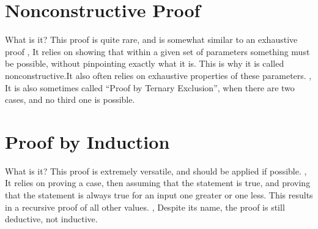 	\section{Nonconstructive Proof}
	\begin{namedframe}{What is it?}
		This proof is quite rare, and is somewhat similar to an exhaustive proof
		\sep
		It relies on showing that within a given set of parameters something must be possible, without pinpointing exactly what it is. This is why it is called nonconstructive.It also often relies on exhaustive properties of these parameters.
		\sep
		It is also sometimes called ``Proof by Ternary Exclusion'', when there are two cases, and no third one is possible.
	\end{namedframe}
	
	\section{Proof by Induction}
	\begin{namedframe}{What is it?}
		This proof is extremely versatile, and should be applied if possible.
		\sep
		It relies on proving a case, then assuming that the statement is true, and proving that the statement is always true for an input one greater or one less. This results in a recursive proof of all other values.
		\sep
		Despite its name, the proof is still deductive, not inductive.
	\end{namedframe}
	
